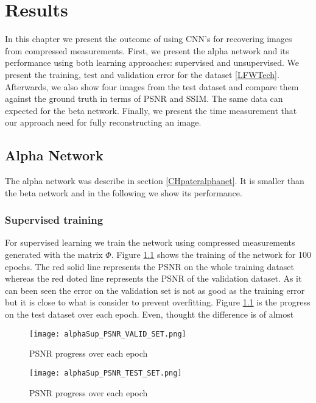 \chapter{Results}
In this chapter we present the outcome of using CNN's for recovering images from compressed measurements. First, we present the alpha network and its performance using both learning approaches: supervised and unsupervised. We present the training, test and validation error for the dataset \ref{LFWTech}. Afterwards, we also show four images from the test dataset and compare them against the ground truth in terms of PSNR and SSIM. The same data can expected for the beta network. Finally, we present the time measurement that our approach need for fully reconstructing an image.  

\section{Alpha Network}
The alpha network was describe in section \ref{CHpateralphanet}. It is smaller than the beta network and in the following we show its performance.
\subsection{Supervised training}
For supervised learning we train the network using compressed measurements generated with the matrix $\Phi$. Figure \ref{fig:alphaSupValidPSNR} shows the training of the network for 100 epochs. The red solid line represents the PSNR on the whole training dataset whereas the red doted line represents the PSNR of the validation dataset. As it can been seen the error on the validation set is not as good as the training error but it is close to what is consider to prevent overfitting. Figure \ref{fig:alphaSupValidPSNR} is the progress on the test dataset over each epoch. Even, thought the difference is of almost  
\begin{figure}[tb] 
\centering 
\texttt{[image: alphaSup\_PSNR\_VALID\_SET.png]} 
\caption[PSNR validation progress during training of supervised alpha network]{PSNR progress over each epoch}
\label{fig:alphaSupValidPSNR} 
\end{figure}  

\begin{figure}[tb] 
\centering 
\texttt{[image: alphaSup\_PSNR\_TEST\_SET.png]} 
\caption[PSNR testing progress during training of supervised alpha network]{PSNR progress over each epoch}
\label{fig:alphaSupTestPSNR} 
\end{figure}  


